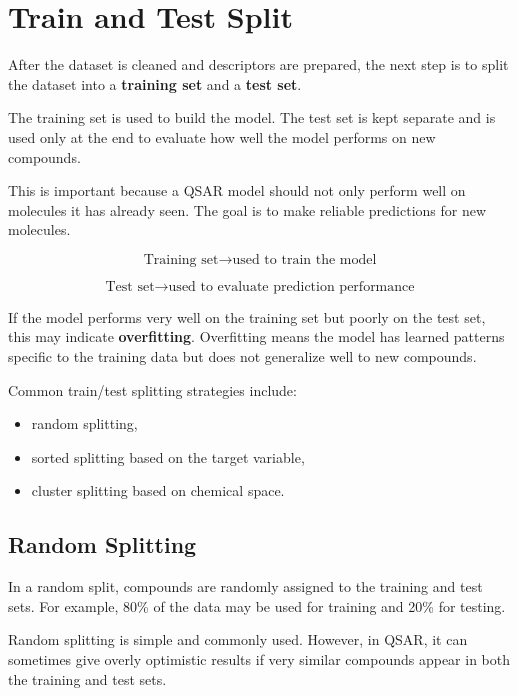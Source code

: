 \documentclass[11pt]{report}
\newenvironment{Important note}{\begin{quote}\color{red}\textbf{Important note:} }{\end{quote}}
\begin{document}
\section{Train and Test Split}

After the dataset is cleaned and descriptors are prepared, the next step is to split the dataset into a \textbf{training set} and a \textbf{test set}.

The training set is used to build the model. The test set is kept separate and is used only at the end to evaluate how well the model performs on new compounds.

This is important because a QSAR model should not only perform well on molecules it has already seen. The goal is to make reliable predictions for new molecules.

\[
\text{Training set} \rightarrow \text{used to train the model}
\]

\[
\text{Test set} \rightarrow \text{used to evaluate prediction performance}
\]

If the model performs very well on the training set but poorly on the test set, this may indicate \textbf{overfitting}. Overfitting means the model has learned patterns specific to the training data but does not generalize well to new compounds.

Common train/test splitting strategies include:

\begin{itemize}[leftmargin=*]
    \item random splitting,
    \item sorted splitting based on the target variable,
    \item cluster splitting based on chemical space.
\end{itemize}

\subsection{Random Splitting}

In a random split, compounds are randomly assigned to the training and test sets. For example, 80\% of the data may be used for training and 20\% for testing.

Random splitting is simple and commonly used. However, in QSAR, it can sometimes give overly optimistic results if very similar compounds appear in both the training and test sets.
\end{document}
